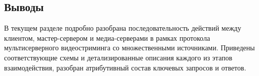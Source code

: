 \subsection*{Выводы}
В текущем разделе подробно разобрана последовательность действий между клиентом, мастер-сервером и медиа-серверами в рамках протокола мультисерверного видеостриминга со множественными источниками. Приведены соответствующие схемы и детализированные описания каждого из этапов взаимодействия, разобран атрибутивный состав ключевых запросов и ответов.

\pagebreak